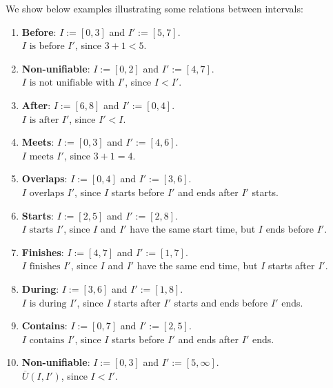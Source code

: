 \begin{example}

We show below examples illustrating some relations between intervals:

\begin{enumerate}
    \item \textbf{Before}: \( I := [0, 3] \) and \( I' := [5, 7] \). \\
    \( I \text{ is before } I' \), since \(3+1 < 5\).

    \item \textbf{Non-unifiable}: \( I := [0,2] \) and \( I' := [4, 7] \). \\
    \( I \text{ is not unifiable with } I' \), since \( I < I' \).

    \item \textbf{After}: \( I := [6, 8] \) and \( I' := [0, 4] \). \\
    \( I \text{ is after } I' \), since \( I' < I \).

    \item \textbf{Meets}: \( I := [0, 3] \) and \( I' := [4, 6] \). \\
    \( I \text{ meets } I' \), since \(3+1 = 4\).

    \item \textbf{Overlaps}: \( I := [0, 4] \) and \( I' := [3, 6] \). \\
    \( I \text{ overlaps } I' \), since \( I \) starts before \( I' \) and ends after \( I' \) starts.

    \item \textbf{Starts}: \( I := [2, 5] \) and \( I' := [2, 8] \). \\
    \( I \text{ starts } I' \), since \( I \) and \( I' \) have the same start time, but \( I \) ends before \( I' \).

    \item \textbf{Finishes}: \( I := [4, 7] \) and \( I' := [1, 7] \). \\
    \( I \text{ finishes } I' \), since \( I \) and \( I' \) have the same end time, but \( I \) starts after \( I' \).

    \item \textbf{During}: \( I := [3, 6] \) and \( I' := [1, 8] \). \\
    \( I \text{ is during } I' \), since \( I \) starts after \( I' \) starts and ends before \( I' \) ends.

    \item \textbf{Contains}: \( I := [0, 7] \) and \( I' := [2, 5] \). \\
    \( I \text{ contains } I' \), since \( I \) starts before \( I' \) and ends after \( I' \) ends.
    \item \textbf{Non-unifiable}: \( I := [0, 3] \) and \( I' := [5, \infty] \). \\
    \( \overline{U}(I,I') \), since \( I < I' \).
\end{enumerate}
\end{example}


